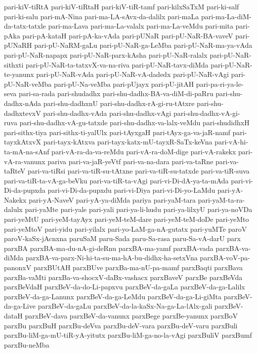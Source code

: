 {pari-kiV-tiRtA
pari-kiV-tiRtaH
pari-kiV-tiR-tamf
pari-kilxSaTxM
pari-ki-salf
pari-ki-salu
pari-mA-Nina
pari-ma-LA-sAvx-da-dalilx
pari-maLa
pari-ma-La-diM-da-tatx-tatxle
pari-ma-Lava
pari-ma-La-valalx
pari-ma-La-veMdu
pari-mita
pari-pAka
pari-pA-kataH
pari-pA-ka-vAda
pari-pUNaR
pari-pU-NaR-BA-vaveV
pari-pUNaRH
pari-pU-NaRM-gaLu
pari-pU-NaR-ga-LeMba
pari-pU-NaR-ma-ya-vAda
pari-pU-NaR-napapx
pari-pU-NaR-parx-kAsha
pari-pU-NaR-ralalx
pari-pU-NaR-sithxti
pari-pU-NaR-ta-tatxvX-va-na-riva
pari-pU-NaR-tavx-diMda
pari-pU-NaR-te-yanunx
pari-pU-NaR-vAda
pari-pU-NaR-vA-dadedx
pari-pU-NaR-vAgi
pari-pU-NaR-veMba
pari-pU-Na-veMba
pari-pUjayx
pari-pU-jitAH
pari-pa-ri-ya-le-seva
pari-sa-rada
pari-shudadhx
pari-shu-dadhx-BA-va-diM-di-paRru
pari-shu-dadhx-nAda
pari-shu-dadhxnU
pari-shu-dadhx-rA-gi-ru-tAtxre
pari-shu-dadhxtevxV
pari-shu-dadhx-vAda
pari-shu-dadhx-vAgi
pari-shu-dadhx-vA-gi-ruva
pari-shu-dadhx-vA-gu-tatxde
pari-shu-dadhx-va-lalx-veMdu
pari-shudidhxH
pari-sithx-tiya
pari-sithx-ti-yalUlx
pari-tAyxgaH
pari-tAyx-ga-va-jaR-namf
pari-tayxkAtxvX
pari-tayx-kAtxva
pari-tayx-katx-mU-tayxR-SaTx-keVna
pari-vA-hi-ta-mA-na-sAnf
pari-vA-ra-da-va-reMdu
pari-vA-ra-doM-dige
pari-vA-rakekx
pari-vA-ra-vanunx
pariva
pari-va-jaR-yeVtf
pari-va-na-dara
pari-va-taRne
pari-va-taRteV
pari-va-tiRsi
pari-va-tiR-su-tAtxne
pari-va-tiR-su-tatxde
pari-va-tiR-suva
pari-va-tiR-ta-vA-ga-beVku
pari-va-tiR-ta-vAgi
pari-vi-Di-dA-ya-ta-mAda
pari-vi-Di-da-pupxda
pari-vi-Di-da-pupxdu
pari-vi-Diya
pari-vi-Di-yo-LaMdu
pari-yA-Nakekx
pari-yA-NaveV
pari-yA-ya-diMda
pariya
pari-yaM-tara
pari-yaM-ta-ra-dalulx
pari-yaMte
pari-yale
pari-yali
pari-ya-li-hudu
pari-ya-lilxyU
pari-ya-noVDa
pari-yeMtU
pari-yeM-tayAyx
pari-yeM-teM-dare
pari-yeM-teM-doDe
pari-yeMto
pari-yeMtoV
pari-yidu
pari-yilalx
pari-yo-LaM-ga-nA-gutatx
pari-yuMTe
paroV
paroV-kaSx-jAcnxna
paruSaM
paru-Sada
paru-Sa-rasa
paru-Sa-vA-darU
parx
parxBA
parxBA-ma-du-nA-gi-deRnu
parxBA-ma-yamf
parxBA-vada
parxBA-va-diMda
parxBA-va-parx-Ni-hi-ta-su-ma-hA-bu-didhx-ha-setxVna
parxBA-voV-pa-panonxV
parxBUtAH
parxBUve
parxBa-ma-nU-pa-mamf
parxBaqti
parxBava
parxBa-vaMti
parxBa-va-shocxV-daBx-vashacx
parxBaveV
parxBe
parxBeVda
parxBeVdaH
parxBeV-da-do-Li-papxvu
parxBeV-da-gaLa
parxBeV-da-ga-Lalilx
parxBeV-da-ga-Lanunx
parxBeV-da-ga-LeMdu
parxBeV-da-ga-Li-giMta
parxBeV-da-ga-Live
parxBeV-da-gaLu
parxBeV-da-la-kaSx-Na-ga-La-lAlx-gali
parxBeV-dataH
parxBeV-dava
parxBeV-da-vanunx
parxBege
parxBe-yanunx
parxBoV
parxBu
parxBuH
parxBu-deVva
parxBu-deV-vara
parxBu-deV-varu
parxBuli
parxBu-liM-ga-mU-tiR-yA-yitutx
parxBu-liM-ga-no-la-vAgi
parxBuliV
parxBumf
parxBu-neMba
}
